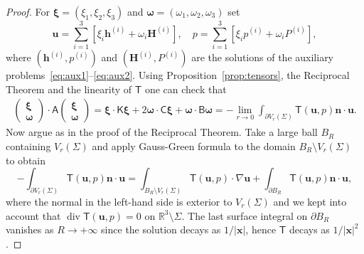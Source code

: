\documentclass[final]{amsart}
\theoremstyle{definition}
\theoremstyle{definition}
\theoremstyle{remark}
\begin{document}
\begin{proof}
  For ${\boldsymbol \xi}=(\xi_1,\xi_2,\xi_3)$ and
  ${\boldsymbol \omega}=(\omega_1,\omega_2,\omega_3)$ set 
\[
{\boldsymbol u} =\sum_{i=1}^3[\xi_i{\boldsymbol h}^{(i)}+\omega_i{\boldsymbol H}^{(i)}],\quad 
p=\sum_{i=1}^3[\xi_ip^{(i)}+\omega_iP^{(i)}],
\]
where $({\boldsymbol h}^{(i)},p^{(i)})$ and $({\boldsymbol H}^{(i)},P^{(i)})$ are the
solutions of the auxiliary problems~\eqref{eq:aux1}--\eqref{eq:aux2}.
Using Proposition~\ref{prop:tensors}, the Reciprocal Theorem and the
linearity of ${\mathsf T}$ one can check that
\begin{gather*}
\begin{pmatrix}{\boldsymbol \xi}\\ {\boldsymbol \omega}\end{pmatrix}\cdot
{\mathsf A} \begin{pmatrix}{\boldsymbol \xi}\\ {\boldsymbol \omega}\end{pmatrix} ={\boldsymbol \xi}\cdot {\mathsf K}{\boldsymbol \xi} + 2{\boldsymbol \omega}\cdot {\mathsf C}{\boldsymbol \xi} +
{\boldsymbol \omega}\cdot {\mathsf B}{\boldsymbol \omega}
=-\lim_{r\to 0} 
\int_{{\partial} V_r({\Sigma})}{\mathsf T}({\boldsymbol u},p){\boldsymbol n}\cdot{\boldsymbol u}.
\end{gather*}
Now argue as in the proof of the Reciprocal Theorem. Take a large ball
$B_R$ containing $V_r({\Sigma})$ and apply Gauss-Green formula to the
domain $B_R\setminus V_r({\Sigma})$ to obtain
\[
-\int_{\partial V_r({\Sigma})}{\mathsf T}({\boldsymbol u},p){\boldsymbol n}\cdot{\boldsymbol u} = 
\int_{B_R\setminus V_r({\Sigma})}{\mathsf T}({\boldsymbol u},p)\cdot\nabla{\boldsymbol u}+
  \int_{\partial B_R}{\mathsf T}({\boldsymbol u},p){\boldsymbol n}\cdot {\boldsymbol u},
\]
where the normal in the left-hand side is exterior to $V_r({\Sigma})$ and
we kept into account that ${\operatorname{\mathrm{div}}}{\mathsf T}({\boldsymbol u},p)=0$ on ${\mathbb R}^3\setminus
{\Sigma}$. The last surface integral on $\partial B_R$ vanishes as
$R\to+\infty$ since the solution decays as
$1/|{\boldsymbol x}|$, hence ${\mathsf T}$ decays as $1/|{\boldsymbol x}|^2$.


\end{proof}
\end{document}
